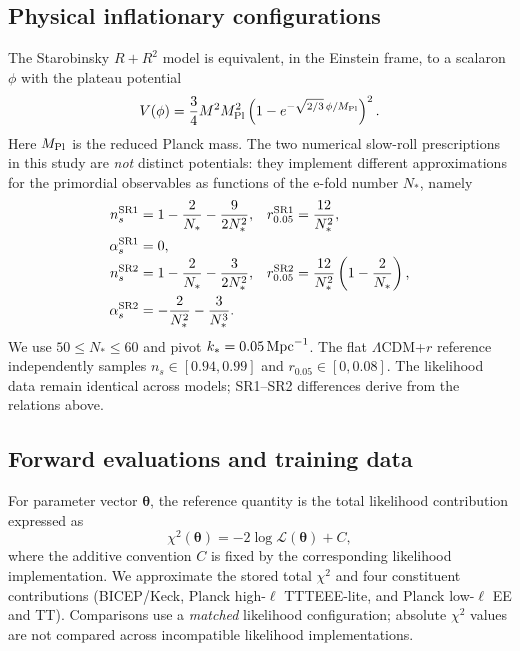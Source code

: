 \documentclass[a4paper,conference,10pt]{IEEEtran}
\begin{document}
\subsection{Physical inflationary configurations}
The Starobinsky $R+R^2$ model is equivalent, in the Einstein frame,
to a scalaron $\phi$ with the plateau potential
\begin{equation}
 V(\phi)=\frac{3}{4}M^2M_{\rm Pl}^2
 \left(1-e^{-\sqrt{2/3}\,\phi/M_{\rm Pl}}\right)^2.
 \label{eq:potential}
\end{equation}
Here $M_{\rm Pl}$ is the reduced Planck mass. The two numerical
slow-roll prescriptions in this study are \emph{not} distinct potentials:
they implement different approximations for the primordial observables
as functions of the e-fold number $N_*$, namely
\begin{align}
 n_s^{\rm SR1}&=1-\frac{2}{N_*}-\frac{9}{2N_*^2}, &
 r_{0.05}^{\rm SR1}&=\frac{12}{N_*^2}, \nonumber\\
 \alpha_s^{\rm SR1}&=0, & & \label{eq:sr1}\\[-1mm]
 n_s^{\rm SR2}&=1-\frac{2}{N_*}-\frac{3}{2N_*^2}, &
 r_{0.05}^{\rm SR2}&=\frac{12}{N_*^2}\left(1-\frac{2}{N_*}\right),\nonumber\\
 \alpha_s^{\rm SR2}&=-\frac{2}{N_*^2}-\frac{3}{N_*^3}. && \label{eq:sr2}
\end{align}
We use $50\leq N_*\leq60$ and pivot $k_*=0.05\,{\rm Mpc}^{-1}$. The flat $\Lambda$CDM+$r$ reference independently samples $n_s\in[0.94,0.99]$ and $r_{0.05}\in[0,0.08]$. The likelihood data remain identical across models; SR1--SR2 differences derive from the relations above.

\subsection{Forward evaluations and training data}
For parameter vector $\boldsymbol\theta$, the reference quantity is the total likelihood contribution expressed as
\begin{equation}
\chi^2(\boldsymbol\theta)=-2\log \mathcal{L}(\boldsymbol\theta)+C,
\label{eq:chi}
\end{equation}
where the additive convention $C$ is fixed by the corresponding likelihood implementation. We approximate the stored total $\chi^2$ and four constituent contributions (BICEP/Keck, Planck high-$\ell$ TTTEEE-lite, and Planck low-$\ell$ EE and TT). Comparisons use a \emph{matched} likelihood configuration; absolute $\chi^2$ values are not compared across incompatible likelihood implementations.
\end{document}
